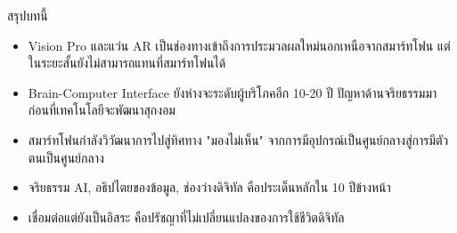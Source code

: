 \begin{tcbsummary}{สรุปบทนี้}
\begin{itemize}
  \item Vision Pro และแว่น AR เป็นช่องทางเข้าถึงการประมวลผลใหม่นอกเหนือจากสมาร์ทโฟน แต่ในระยะสั้นยังไม่สามารถแทนที่สมาร์ทโฟนได้
  \item Brain-Computer Interface ยังห่างจะระดับผู้บริโภคอีก 10-20 ปี ปัญหาด้านจริยธรรมมาก่อนที่เทคโนโลยีจะพัฒนาสุกงอม
  \item สมาร์ทโฟนกำลังวิวัฒนาการไปสู่ทิศทาง "มองไม่เห็น" จากการมีอุปกรณ์เป็นศูนย์กลางสู่การมีตัวตนเป็นศูนย์กลาง
  \item จริยธรรม AI, อธิปไตยของข้อมูล, ช่องว่างดิจิทัล คือประเด็นหลักใน 10 ปีข้างหน้า
  \item เชื่อมต่อแต่ยังเป็นอิสระ คือปรัชญาที่ไม่เปลี่ยนแปลงของการใช้ชีวิตดิจิทัล
\end{itemize}

\end{tcbsummary}

